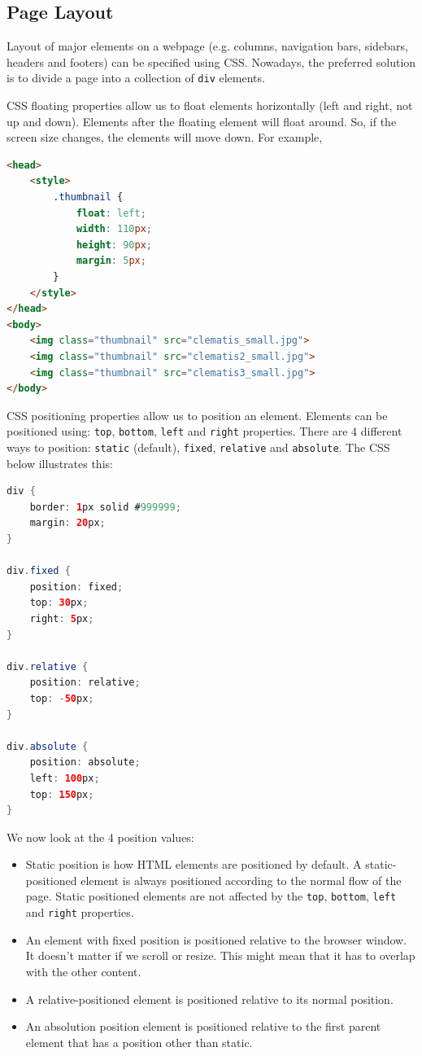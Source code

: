 \documentclass[a4paper, openany]{memoir}
\begin{document}
\subsection{Page Layout}
Layout of major elements on a webpage (e.g. columns, navigation bars, sidebars, headers and footers) can be specified using CSS. Nowadays, the preferred solution is to divide a page into a collection of \texttt{div} elements.

CSS floating properties allow us to float elements horizontally (left and right, not up and down). Elements after the floating element will float around. So, if the screen size changes, the elements will move down. For example,
\begin{lstlisting}[language=html]
<head>
    <style>
        .thumbnail {
            float: left;
            width: 110px;
            height: 90px;
            margin: 5px;
        }
    </style>
</head>
<body>
    <img class="thumbnail" src="clematis_small.jpg">
    <img class="thumbnail" src="clematis2_small.jpg">
    <img class="thumbnail" src="clematis3_small.jpg">
</body>
\end{lstlisting}
CSS positioning properties allow us to position an element. Elements can be positioned using: \texttt{top}, \texttt{bottom}, \texttt{left} and \texttt{right} properties. There are 4 different ways to position: \texttt{static} (default), \texttt{fixed}, \texttt{relative} and \texttt{absolute}. The CSS below illustrates this:
\begin{lstlisting}[language=java]
div {
    border: 1px solid #999999;
    margin: 20px;
}

div.fixed {
    position: fixed;
    top: 30px;
    right: 5px;
}

div.relative {
    position: relative;
    top: -50px;
}

div.absolute {
    position: absolute;
    left: 100px;
    top: 150px;
}
\end{lstlisting}
We now look at the 4 position values:
\begin{itemize}
    \item Static position is how HTML elements are positioned by default. A static-positioned element is always positioned according to the normal flow of the page. Static positioned elements are not affected by the \texttt{top}, \texttt{bottom}, \texttt{left} and \texttt{right} properties.
    \item An element with fixed position is positioned relative to the browser window. It doesn't matter if we scroll or resize. This might mean that it has to overlap with the other content.
    \item A relative-positioned element is positioned relative to its normal position.
    \item An absolution position element is positioned relative to the first parent element that has a position other than static.
\end{itemize}
\end{document}
